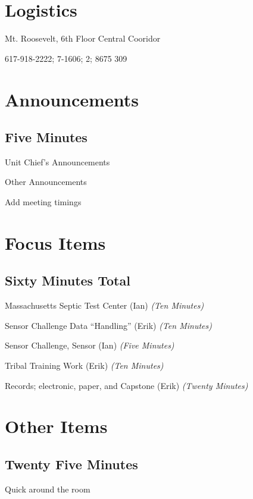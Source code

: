 \documentclass[agenda]{meetingmins}
\begin{document}
\maketitle

\section{Logistics}
\begin{items}
\item Mt. Roosevelt, 6th Floor Central Cooridor
\item 617-918-2222; 7-1606; 2; 8675 309
\end{items}

\section{Announcements}
\subsection {Five Minutes}

\begin{items}
\item Unit Chief's Announcements
\item Other Announcements
\end{items}

\begin{hiddenitems}
\item Add meeting timings
\end{hiddenitems}

\section{Focus Items}
\subsection{Sixty Minutes Total}

\begin{items}
\item Massachusetts Septic Test Center (Ian) {\em(Ten Minutes)}
\item Sensor Challenge Data ``Handling'' (Erik) {\em(Ten Minutes)}
\item Sensor Challenge, Sensor (Ian) {\em(Five Minutes)}
\item Tribal Training Work (Erik) {\em(Ten Minutes)}
\item Records; electronic, paper, and Capstone (Erik) {\em(Twenty Minutes)}
\end{items}

\section{Other Items}
\subsection{Twenty Five Minutes}

\begin{items}
\item Quick around the room
\end{items}
\end{document}
